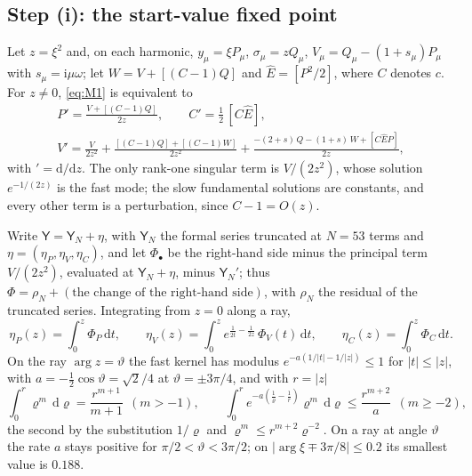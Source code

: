 \documentclass{amsart}
\numberwithin{equation}{section}
\theoremstyle{plain}
\theoremstyle{definition}
\theoremstyle{remark}
\newcommand{\iu}{\mathrm{i}}
\newcommand{\dd}{\mathrm{d}}
\begin{document}
\subsection{Step (i): the start-value fixed point}
Let $z = \xi^2$ and, on each harmonic, $y_\mu = \xi P_\mu$, $\sigma_\mu = zQ_\mu$, $V_\mu = Q_\mu - (1+s_\mu)P_\mu$ with
$s_\mu = \iu\mu\omega$; let $W = V + [(C-1)Q]$ and $\hat E = [P^2/2]$, where $C$ denotes $c$. For $z \ne 0$, \eqref{eq:M1} is
equivalent to
\begin{equation}\label{eq:PVC}
\begin{gathered}
P' = \frac{V + [(C-1)Q]}{2z}, \qquad C' = \tfrac12\,[C\hat E] ,\\
V' = \frac{V}{2z^2} + \frac{[(C-1)Q] + [(C-1)W]}{2z^2} + \frac{-(2+s)\,Q - (1+s)\,W + [C\hat EP]}{2z},
\end{gathered}
\end{equation}
with $' = \dd/\dd z$. The only rank-one singular term is $V/(2z^2)$, whose solution $e^{-1/(2z)}$ is the fast mode; the slow
fundamental solutions are constants, and every other term is a perturbation, since $C - 1 = O(z)$.

Write $\mathsf Y = \mathsf Y_N + \eta$, with $\mathsf Y_N$ the formal series truncated at $N = 53$ terms and
$\eta = (\eta_P, \eta_V, \eta_C)$, and let $\Phi_\bullet$ be the right-hand side minus the principal term $V/(2z^2)$, evaluated
at $\mathsf Y_N + \eta$, minus $\mathsf Y_N'$; thus $\Phi = \rho_N + (\text{the change of the right-hand side})$, with $\rho_N$ the
residual of the truncated series. Integrating from $z = 0$ along a ray,
\begin{equation}\label{eq:inteq}
\eta_P(z) = \int_0^z \Phi_P\,\dd t, \qquad
\eta_V(z) = \int_0^z e^{\frac{1}{2t} - \frac{1}{2z}}\,\Phi_V(t)\,\dd t, \qquad
\eta_C(z) = \int_0^z \Phi_C\,\dd t .
\end{equation}
On the ray $\arg z = \vartheta$ the fast kernel has modulus $e^{-a(1/|t| - 1/|z|)} \le 1$ for $|t| \le |z|$, with
$a = -\tfrac12\cos\vartheta = \sqrt2/4$ at $\vartheta = \pm3\pi/4$, and with $r = |z|$
\begin{equation}\label{eq:kernels}
\int_0^r \varrho^m\,\dd\varrho = \frac{r^{m+1}}{m+1}\ \ (m > -1), \qquad
\int_0^r e^{-a\left(\frac1\varrho - \frac1r\right)}\varrho^m\,\dd\varrho \le \frac{r^{m+2}}{a}\ \ (m \ge -2) ,
\end{equation}
the second by the substitution $1/\varrho$ and $\varrho^m \le r^{m+2}\varrho^{-2}$. On a ray at angle $\vartheta$ the rate $a$
stays positive for $\pi/2 < \vartheta < 3\pi/2$; on $|\arg\xi \mp 3\pi/8| \le 0.2$ its smallest value is $0.188$.
\end{document}
